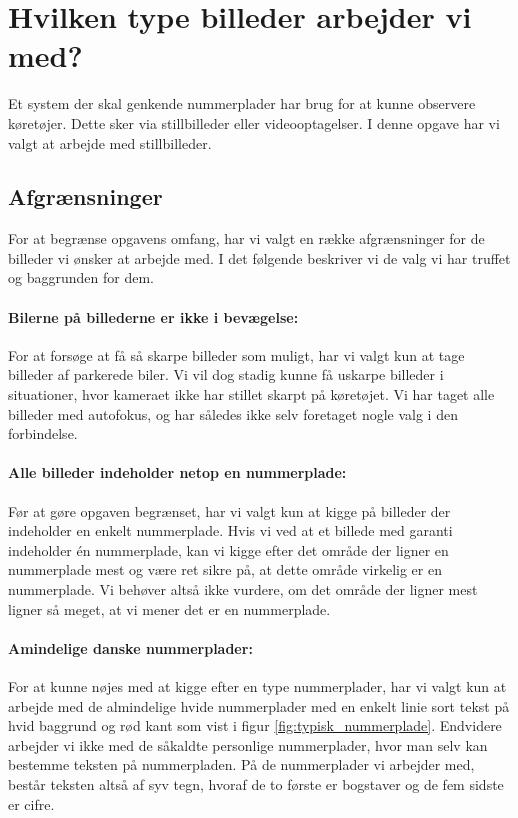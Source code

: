 
\section{Hvilken type billeder arbejder vi med?}
\label{sec:data}
Et system der skal genkende nummerplader har brug for at kunne observere køretøjer. Dette sker via stillbilleder eller videooptagelser. I denne opgave har vi valgt at arbejde med stillbilleder.

\subsection{Afgrænsninger}
For at begrænse opgavens omfang, har vi valgt en række afgrænsninger for de billeder vi ønsker at arbejde med. I det følgende beskriver vi de valg vi har truffet og baggrunden for dem.

\paragraph{Bilerne på billederne er ikke i bevægelse:}
For at forsøge at få så skarpe billeder som muligt, har vi valgt kun at tage billeder af parkerede biler. Vi vil dog stadig kunne få uskarpe billeder i situationer, hvor kameraet ikke har stillet skarpt på køretøjet. Vi har taget alle billeder med autofokus, og har således ikke selv foretaget nogle valg i den forbindelse.

\paragraph{Alle billeder indeholder netop en nummerplade:}
Før at gøre opgaven begrænset, har vi valgt kun at kigge på billeder der indeholder en enkelt nummerplade. Hvis vi ved at et billede med garanti indeholder én nummerplade, kan vi kigge efter det område der ligner en nummerplade mest og være ret sikre på, at dette område virkelig er en nummerplade. Vi behøver altså ikke vurdere, om det område der ligner mest ligner så meget, at vi mener det er en nummerplade.

\paragraph{Amindelige danske nummerplader:}
For at kunne nøjes med at kigge efter en type nummerplader, har vi valgt kun at arbejde med de almindelige hvide nummerplader med en enkelt linie sort tekst på hvid baggrund og rød kant som vist i figur \vref{fig:typisk_nummerplade}. Endvidere arbejder vi ikke med de såkaldte personlige nummerplader, hvor man selv kan bestemme teksten på nummerpladen. På de nummerplader vi arbejder med, består teksten altså af syv tegn, hvoraf de to første er bogstaver og de fem sidste er cifre.

